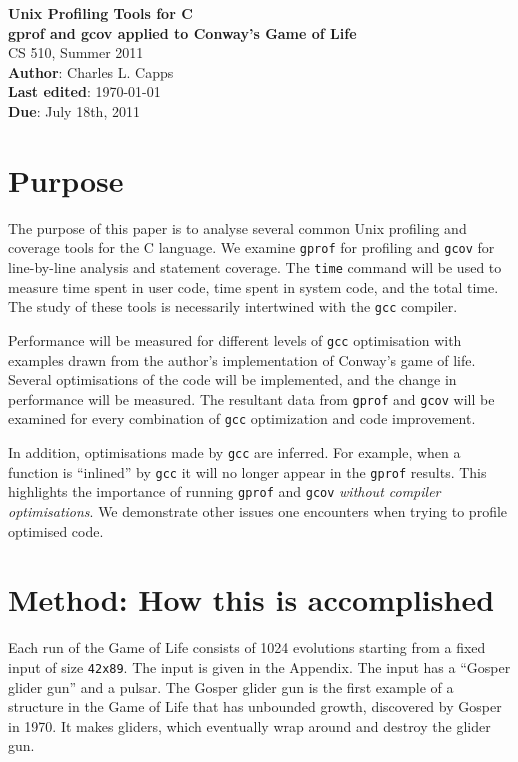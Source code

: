 \documentclass{article}
\begin{document}
\begin{center} 
\textbf{\Huge{Unix Profiling Tools for C} \\
\LARGE{gprof and gcov applied to Conway's Game of Life}} \\
\LARGE{CS 510, Summer 2011} \\
\LARGE{\textbf{Author}: Charles L. Capps\\
\textbf{Last edited}: \today\\ 
\textbf{Due}: July 18th, 2011\\
}
\end{center}

\section{Purpose}
The purpose of this paper is to analyse several common Unix profiling and coverage tools for the C language. We examine \verb=gprof= for profiling and \verb=gcov= for line-by-line analysis and statement coverage. The \verb=time= command will be used to measure time spent in user code, time spent in system code, and the total time. The study of these tools is necessarily intertwined with the \verb=gcc= compiler. 

Performance will be measured for different levels of \verb=gcc= optimisation with examples drawn from the author's implementation of Conway's game of life. Several optimisations of the code will be implemented, and the change in performance will be measured. The resultant data from \verb=gprof= and \verb=gcov= will be examined for every combination of \verb=gcc= optimization and code improvement. 

In addition, optimisations made by \verb=gcc= are inferred. For example, when a function is ``inlined'' by \verb=gcc= it will no longer appear in the \verb=gprof= results. This highlights the importance of running \verb=gprof= and \verb=gcov= \emph{without compiler optimisations}. We demonstrate other issues one encounters when trying to profile optimised code. 

\section{Method: How this is accomplished}
Each run of the Game of Life consists of 1024 evolutions starting from a fixed input of size \verb=42x89=. The input is given in the Appendix. The input has a ``Gosper glider gun'' and a pulsar. The Gosper glider gun is the first example of a structure in the Game of Life that has unbounded growth, discovered by Gosper in 1970. It makes gliders, which eventually wrap around and destroy the glider gun. 
\end{document}
